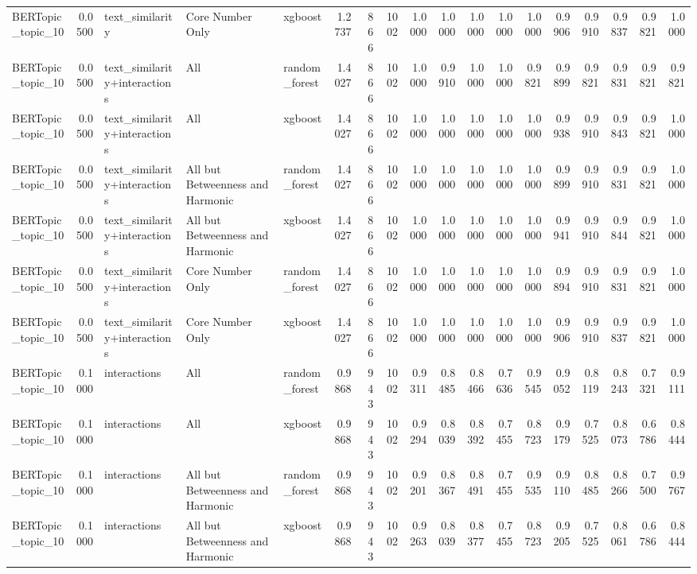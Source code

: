 \begin{tabular}{lrlllrrrrrrrrrrrrr}
BERTopic_topic_10 & 0.0500 & text_similarity & Core Number Only & xgboost & 1.2737 & 866 & 1002 & 1.0000 & 1.0000 & 1.0000 & 1.0000 & 1.0000 & 0.9906 & 0.9910 & 0.9837 & 0.9821 & 1.0000 \\
BERTopic_topic_10 & 0.0500 & text_similarity+interactions & All & random_forest & 1.4027 & 866 & 1002 & 1.0000 & 0.9910 & 1.0000 & 1.0000 & 0.9821 & 0.9899 & 0.9821 & 0.9831 & 0.9821 & 0.9821 \\
BERTopic_topic_10 & 0.0500 & text_similarity+interactions & All & xgboost & 1.4027 & 866 & 1002 & 1.0000 & 1.0000 & 1.0000 & 1.0000 & 1.0000 & 0.9938 & 0.9910 & 0.9843 & 0.9821 & 1.0000 \\
BERTopic_topic_10 & 0.0500 & text_similarity+interactions & All but Betweenness and Harmonic & random_forest & 1.4027 & 866 & 1002 & 1.0000 & 1.0000 & 1.0000 & 1.0000 & 1.0000 & 0.9899 & 0.9910 & 0.9831 & 0.9821 & 1.0000 \\
BERTopic_topic_10 & 0.0500 & text_similarity+interactions & All but Betweenness and Harmonic & xgboost & 1.4027 & 866 & 1002 & 1.0000 & 1.0000 & 1.0000 & 1.0000 & 1.0000 & 0.9941 & 0.9910 & 0.9844 & 0.9821 & 1.0000 \\
BERTopic_topic_10 & 0.0500 & text_similarity+interactions & Core Number Only & random_forest & 1.4027 & 866 & 1002 & 1.0000 & 1.0000 & 1.0000 & 1.0000 & 1.0000 & 0.9894 & 0.9910 & 0.9831 & 0.9821 & 1.0000 \\
BERTopic_topic_10 & 0.0500 & text_similarity+interactions & Core Number Only & xgboost & 1.4027 & 866 & 1002 & 1.0000 & 1.0000 & 1.0000 & 1.0000 & 1.0000 & 0.9906 & 0.9910 & 0.9837 & 0.9821 & 1.0000 \\
BERTopic_topic_10 & 0.1000 & interactions & All & random_forest & 0.9868 & 943 & 1002 & 0.9311 & 0.8485 & 0.8466 & 0.7636 & 0.9545 & 0.9052 & 0.8119 & 0.8243 & 0.7321 & 0.9111 \\
BERTopic_topic_10 & 0.1000 & interactions & All & xgboost & 0.9868 & 943 & 1002 & 0.9294 & 0.8039 & 0.8392 & 0.7455 & 0.8723 & 0.9179 & 0.7525 & 0.8073 & 0.6786 & 0.8444 \\
BERTopic_topic_10 & 0.1000 & interactions & All but Betweenness and Harmonic & random_forest & 0.9868 & 943 & 1002 & 0.9201 & 0.8367 & 0.8491 & 0.7455 & 0.9535 & 0.9110 & 0.8485 & 0.8266 & 0.7500 & 0.9767 \\
BERTopic_topic_10 & 0.1000 & interactions & All but Betweenness and Harmonic & xgboost & 0.9868 & 943 & 1002 & 0.9263 & 0.8039 & 0.8377 & 0.7455 & 0.8723 & 0.9205 & 0.7525 & 0.8061 & 0.6786 & 0.8444 \\

\end{tabular}
